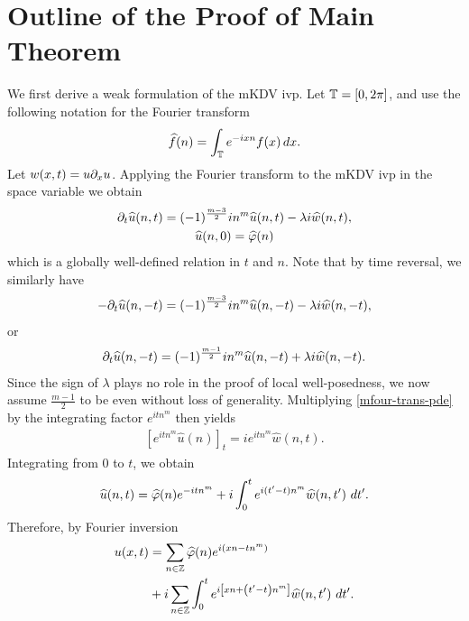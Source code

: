 \section{Outline of the Proof of Main Theorem}
%
%
%
%
%
We first derive a weak formulation of the mKDV ivp. 
Let $\mathbb{T} = [0, 2 \pi]$, and use
the following notation for the Fourier transform
%
%
%
%
\begin{equation}
	\label{mfour-trans-pde}
	\begin{split}
		\widehat{f}(n) = \int_{\mathbb{T}} e^{-ix n} f(x) \, dx.
	\end{split}
\end{equation}
Let $w(x,t) = u \partial_x u$. Applying 
the Fourier transform to the mKDV ivp in the space variable we obtain 
%
%
\begin{gather*}
	\partial_t \widehat{u}(n, t) = (-1)^{\frac{m-3}{2}}i n^m \widehat{u}(n, t) - \lambda i  
	\widehat{w} (n, t),
	\\
	\widehat{u} (n,0) = \widehat{\varphi}(n)
\end{gather*}
%
%
which is a globally well-defined relation in $t$ 
and $n$. Note that by time reversal, we similarly have 
\begin{gather*}
	-\partial_t \widehat{u}(n, -t) = (-1)^{\frac{m-3}{2}}i n^m \widehat{u}(n, -t) - \lambda i  
	\widehat{w} (n, -t),
\end{gather*}
or
\begin{gather*}
	\partial_t \widehat{u}(n, -t) = (-1)^{\frac{m-1}{2}}i n^m \widehat{u}(n, -t) + \lambda i  
	\widehat{w} (n, -t).
\end{gather*}
Since the sign of $\lambda$ plays no role in the proof of local well-posedness,
we now assume $\frac{m-1}{2}$ to be even without loss of generality. 
Multiplying \eqref{mfour-trans-pde} by the integrating factor $e^{itn^m}$ then yields
\begin{equation*}
	\begin{split}
		\left[ e^{ it n^m} \widehat{u}(n) \right]_t = i
		 e^{ it n^m} \widehat{w} (n, t).	
	\end{split}
\end{equation*}
%
%
Integrating from $0$ to $t$, we obtain
%
%
\begin{equation*}
	\begin{split}
		\wh{u}(n, t) = \wh{\vp}(n) e^{- it n^m} + i  
		\int_0^t e^{ i(t' - t) n^m} \wh{w}(n, t') \ 
		dt'.
	\end{split}
\end{equation*}
%
%
Therefore, by Fourier inversion 
%
%
\begin{equation}
	\label{mmKDV-integral-form}
	\begin{split}
		u(x,t) & = \sum_{n \in \mathbb{Z}} \widehat{\varphi}(n) e^{i\left( xn - t n^m 
		\right)} 
		\\
		& + i \sum_{n \in \mathbb{Z}} \int_0^t e^{i\left[ xn + \left( t' - t 
		\right) n^m \right]} \widehat{w}(n, t') \ dt'.
	\end{split}
\end{equation}
